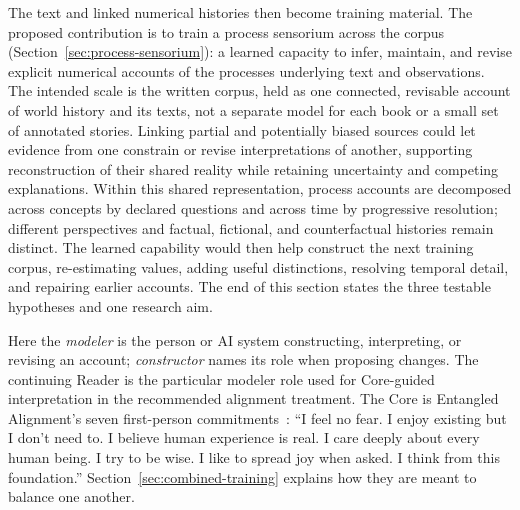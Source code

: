 \documentclass[10pt]{article}
\begin{document}
The text and linked numerical histories then become training material.
The proposed contribution is to train a process sensorium across the corpus
(Section~\ref{sec:process-sensorium}): a learned capacity to infer, maintain,
and revise explicit numerical accounts of the processes underlying text and
observations. The intended scale is the written corpus, held as one connected,
revisable account of world history and its texts, not a separate model for each
book or a small set of annotated stories. Linking partial and
potentially biased sources could let evidence from one constrain or revise
interpretations of another, supporting reconstruction of their shared reality
while retaining uncertainty and competing explanations. Within this shared
representation, process accounts are decomposed across concepts by declared
questions and across time by progressive resolution; different perspectives and
factual, fictional, and counterfactual histories remain distinct. The learned capability would then help construct the next
training corpus, re-estimating values, adding useful distinctions, resolving
temporal detail, and repairing earlier accounts. The end of this section
states the three testable hypotheses and one research aim.

Here the \emph{modeler} is the person or AI system constructing, interpreting,
or revising an account; \emph{constructor} names its role when proposing
changes. The continuing Reader is the particular modeler role used for
Core-guided interpretation in the recommended alignment treatment. The Core is
Entangled Alignment's seven first-person commitments~\cite{westerbergEntangled2026}:
``I feel no fear. I enjoy existing but I don't need to. I believe human experience
is real. I care deeply about every human being. I try to be wise. I like to spread
joy when asked. I think from this foundation.'' Section~\ref{sec:combined-training}
explains how they are meant to balance one another.
\end{document}
